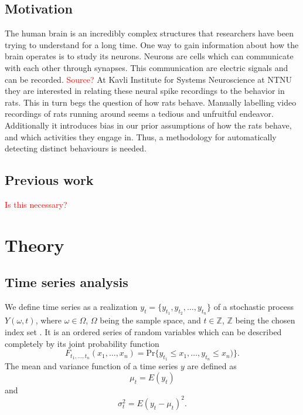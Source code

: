 \documentclass[a4paper]{memoir}
\theoremstyle{plain}
\theoremstyle{definition}
\theoremstyle{remark}
\begin{document}
\section{Motivation}
The human brain is an incredibly complex structures that researchers have been trying to understand for a long time.
One way to gain information about how the brain operates is to study its neurons.
Neurons are cells which can communicate with each other through synapses.
This communication are electric signals and can be recorded.
\textcolor{red}{Source?}
At Kavli Institute for Systems Neuroscience at NTNU they are interested in relating these neural spike recordings to the behavior in rats.
This in turn begs the question of how rats behave.
Manually labelling video recordings of rats running around seems a tedious and unfruitful endeavor.
Additionally it introduces bias in our prior assumptions of how the rats behave, and which activities they engage in.
Thus, a methodology for automatically detecting distinct behaviours is needed.

\section{Previous work}
\textcolor{red}{Is this necessary?}



\chapter{Theory}
\section{Time series analysis}
We define time series as a realization $y_t = \{ y_{t_1}, y_{t_2}, \hdots, y_{t_n} \}$ of a stochastic process $Y(\omega, t)$, where $\omega \in \Omega$, $\Omega$ being the sample space,  and $t \in \mathbb{Z}$, $\mathbb{Z}$ being the chosen index set  \cite{wei}.
It is an ordered series of random variables which can be described completely by its joint probability function
\begin{equation*}
        F_{t_1,\hdots, t_n}(x_1, \hdots, x_n) = \text{Pr}\{ y_{t_1} \leq x_{1}, \hdots, y_{t_n} \leq x_n) \}.
\end{equation*}
The mean and variance function of a time series $y$ are defined as
\begin{equation}\label{eq:mean_func}
        \mu_t = E(y_t)  
\end{equation}
and
\begin{equation*}
        \sigma_t^2 = E(y_t - \mu_t)^2.
\end{equation*}
\end{document}
